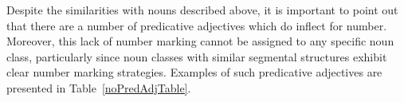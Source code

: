 
Despite the similarities with nouns described above, it is important to point out that there are a number of predicative adjectives which do  inflect for number. Moreover, this lack of number marking cannot be assigned to any specific noun class, %
particularly since noun classes with similar segmental structures exhibit clear number marking strategies. Examples of such predicative adjectives are presented in Table~\vref{noPredAdjTable}. 

